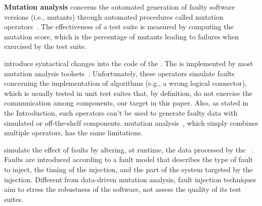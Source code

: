 \textbf{Mutation analysis} concerns the automated generation of faulty software versions (i.e., mutants) through automated procedures called mutation operators~\cite{jia2010analysis,papadakis2019mutation}. The effectiveness of a test suite is measured by computing the mutation score, which is the percentage of mutants leading to failures when exercised by the test suite.

 introduce syntactical changes into the code of the . The   is implemented by most mutation analysis toolsets~\cite{offutt1996experimental,rothermel1996experimental,andrews2005mutation,kintis2017detecting,offutt1996experimental}. 
Unfortunately, these operators simulate faults concerning the implementation of algorithms (e.g., a wrong logical connector), which is usually tested in unit test suites that, by definition, do not exercise the communication among components, our target in this paper. 
Also, as stated in the Introduction, such operators can't be used to generate faulty data with simulated or off-the-shelf components.
 mutation analysis~\cite{harman2010manifesto}, which simply combines multiple operators, has the same limitations.






 simulate the effect of faults by altering, at runtime, the data processed by the ~\cite{natella2016assessing}. Faults are introduced according to a fault model that describes the type of fault to inject, the timing of the injection, and the part of the system targeted by the injection. Different from data-driven mutation analysis, fault injection techniques aim to stress the robustness of the software,  
not assess the quality of its test suites.



